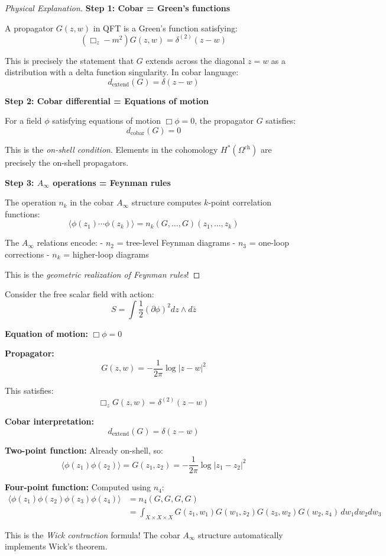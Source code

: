 \begin{proof}[Physical Explanation]
\textbf{Step 1: Cobar = Green's functions}

A propagator $G(z,w)$ in QFT is a Green's function satisfying:
$$(\Box_z - m^2) G(z,w) = \delta^{(2)}(z - w)$$

This is precisely the statement that $G$ extends across the diagonal $z = w$ as 
a distribution with a delta function singularity. In cobar language:
$$d_{\text{extend}}(G) = \delta(z - w)$$

\textbf{Step 2: Cobar differential = Equations of motion}

For a field $\phi$ satisfying equations of motion $\Box \phi = 0$, the propagator 
$G$ satisfies:
$$d_{\text{cobar}}(G) = 0$$

This is the \emph{on-shell condition}. Elements in the cohomology $H^*(\Omega^{\text{ch}})$ 
are precisely the on-shell propagators.

\textbf{Step 3: $A_\infty$ operations = Feynman rules}

The operation $n_k$ in the cobar $A_\infty$ structure computes $k$-point correlation 
functions:
$$\langle \phi(z_1) \cdots \phi(z_k) \rangle = n_k(G, \ldots, G)(z_1, \ldots, z_k)$$

The $A_\infty$ relations encode:
- $n_2$ = tree-level Feynman diagrams
- $n_3$ = one-loop corrections
- $n_k$ = higher-loop diagrams

This is the \emph{geometric realization of Feynman rules}!
\end{proof}

\begin{example}\label{ex:free-scalar-cobar}

Consider the free scalar field with action:
$$S = \int \frac{1}{2} (\partial \phi)^2 dz \wedge d\bar{z}$$

\textbf{Equation of motion:} $\Box \phi = 0$

\textbf{Propagator:}
$$G(z,w) = -\frac{1}{2\pi} \log|z - w|^2$$

This satisfies:
$$\Box_z G(z,w) = \delta^{(2)}(z - w)$$

\textbf{Cobar interpretation:}
$$d_{\text{extend}}(G) = \delta(z - w)$$

\textbf{Two-point function:} Already on-shell, so:
$$\langle \phi(z_1) \phi(z_2) \rangle = G(z_1, z_2) = -\frac{1}{2\pi} \log|z_1 - z_2|^2$$

\textbf{Four-point function:} Computed using $n_4$:
\begin{align*}
\langle \phi(z_1) \phi(z_2) \phi(z_3) \phi(z_4) \rangle &= n_4(G, G, G, G) \\
&= \int_{X \times X \times X} G(z_1, w_1) G(w_1, z_2) G(z_3, w_2) G(w_2, z_4) \, 
dw_1 dw_2 dw_3
\end{align*}

This is the \emph{Wick contraction} formula! The cobar $A_\infty$ structure 
automatically implements Wick's theorem.
\end{example}

